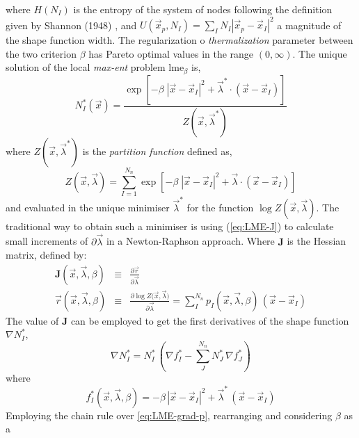 \message{ !name(2020_EFM_MPM_Eigensoftening.tex)}\documentclass[preprint,12pt,a4paper]{elsarticle}
\newcommand{\tens}[1]{
  \ensuremath{\mathbf{{#1}}}
}
\begin{document}
where $H(N_I)$ is the entropy of the system of nodes following the
definition given by Shannon (1948) \cite{Shannon1948}, and $U(\vec{x}_p,N_I) =
\sum_I N_I |\vec{x}_p - \vec{x}_I |^2$ a magnitude of the shape
function width. The regularization o \textit{thermalization} parameter
between the two criterion $\beta$ has Pareto optimal values in the
range $(0,\infty)$. The unique solution of the local \textit{max-ent} problem
 \acrshort{lme}$_\beta$ is,
 \begin{equation}
  \label{eq:LME-p}
N_I^*(\vec{x})=\frac{\exp\left[ -\beta \; |\vec{x}-\vec{x}_I|^2 +
    \vec{\lambda}^* \cdot (\vec{x}-\vec{x}_I) \right] } {Z(\vec{x},\vec{\lambda}^*)}
\end{equation}
where $Z(\vec{x},\vec{\lambda}^*)$ is the \textit{partition function} defined as,
\begin{equation}
  \label{eq:LME-Z}
Z(\vec{x}, {\vec{\lambda}}) = \sum_{I=1}^{N_n}{ \exp \left[ -\beta \; |\vec{x}-\vec{x}_I|^2 + \vec{\lambda} \cdot (\vec{x}-\vec{x}_I)  \right]}
\end{equation}
and evaluated in the unique minimiser $\vec{\lambda}^*$ for the function $\log
Z(\vec{x}, \vec{\lambda})$. The traditional way to obtain
such a minimiser is using (\ref{eq:LME-J}) to calculate small
increments of $\partial\vec{\lambda}$ in a Newton-Raphson
approach. Where $\tens{J}$ is the Hessian matrix, defined by:
\begin{eqnarray}
  \label{eq:LME-J} 
  \tens{J}(\vec{x}, \vec{\lambda},\beta) &\equiv& \frac{\partial
                                                  \vec{r}}{\partial \vec{\lambda}}\\
  \label{eq:LME-r}
  \vec{r}(\vec{x},\vec{\lambda},\beta) &\equiv& \frac{\partial \log{ Z(   \vec{x},\vec{\lambda}})}{\partial \vec{\lambda}}  = \sum_I^{N_n} p_I(\vec{x},\vec{\lambda},\beta) \, (\vec{x} - \vec{x}_I)
\end{eqnarray}
The value of $\tens{J}$ can be employed to get the first derivatives of the shape function $\nabla
N^*_I$,
\begin{equation}
  \label{eq:LME-grad-p}
\nabla N^*_I = N^*_I  \, \left(\nabla f^*_I-\sum_J^{N_n} N^*_J \, \nabla f^*_J\right)
\end{equation}
where
\begin{equation}
  \label{eq:LME-f}
f^*_I(\vec{x},  \vec{\lambda},\beta)=-\beta \, |\vec{x}-\vec{x}_I|^2 + \vec{\lambda}^*  \,  (\vec{x}-\vec{x}_I)
\end{equation}
Employing the chain rule over \eqref{eq:LME-grad-p}, rearranging and considering $\beta$ as a
\end{document}
